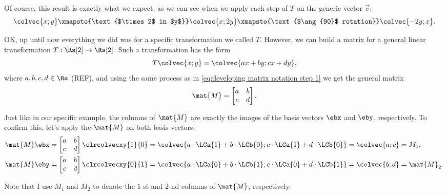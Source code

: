 Of course, this result is exactly what we expect, as we can see when we apply each step of $T$ on the generic vector $\vec{v}$:
\begin{equation}
	\colvec{x;y} \xmapsto{\text{$\times 2$ in $y$}} \colvec{x;2y} \xmapsto{\text{$\ang{90}$ rotation}} \colvec{-2y;x}.
	\label{eq:}
\end{equation}

OK, up until now everything we did was for a specific transformation we called $T$. However, we can build a matrix for a general linear transformation $T:\Rs[2]\to\Rs[2]$. Such a transformation has the form
\begin{equation*}
	T\colvec{x;y} = \colvec{ax+by;cx+dy},
\end{equation*}
where $a,b,c,d\in\Rs$ (REF), and using the same process as in \autoref{eq:developing matrix notation step 1} we get the general matrix
\begin{equation}
	\mat{M} = \begin{bmatrix}
		a & b \\
		c & d
	\end{bmatrix}.
	\label{eq:general 2x2 matrix}
\end{equation}

Just like in our specific example, the columns of $\mat{M}$ are exactly the images of the basis vectors $\ebx$ and $\eby$, respectively. To confirm this, let's apply the $\mat{M}$ on both basis vectors:
\begin{equation}
	\begin{aligned}
		\mat{M}\ebx & =
		\begin{bmatrix}
			a & b \\
			c & d
		\end{bmatrix}\clrcolvecxy{1}{0} = \colvec{a\cdot\LCa{1}+b\cdot\LCb{0};c\cdot\LCa{1}+d\cdot\LCb{0}} = \colvec{a;c} = M_{1}, \\
		\mat{M}\eby & =
		\begin{bmatrix}
			a & b \\
			c & d
		\end{bmatrix}\clrcolvecxy{0}{1} = \colvec{a\cdot\LCa{0}+b\cdot\LCb{1};c\cdot\LCa{0}+d\cdot\LCb{1}} = \colvec{b;d} = \mat{M}_{2}.
		\label{eq:applying a general 2x2 matrix on basis vectors}
	\end{aligned}
\end{equation}

Note that I use $M_{1}$ and $M_{2}$ to denote the $1$-st and $2$-nd columns of $\mat{M}$, respectively.

